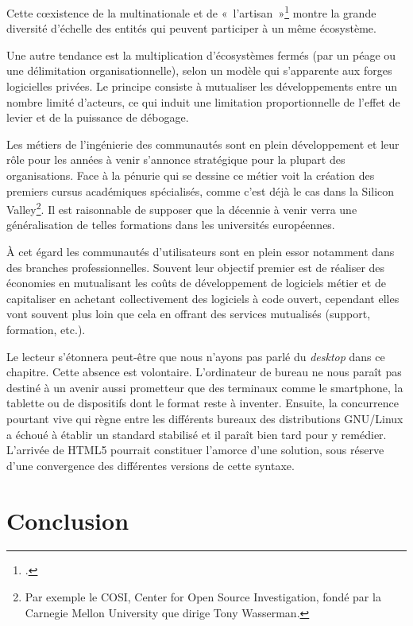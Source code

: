 \documentclass{FramateX}
\begin{document}
\begin{refsection}
Cette cœxistence de la multinationale et de
«~l'artisan~»\footnote{\cite{guesdonsur2012}.} montre la grande
diversité d'échelle des entités qui peuvent participer
à un même écosystème.

Une autre tendance est la multiplication d'écosystèmes fermés (par un
péage ou une délimitation organisationnelle), selon un modèle qui
s'apparente aux forges logicielles privées. Le principe consiste à
mutualiser les développements entre un nombre limité d'acteurs, ce qui
induit une limitation proportionnelle de l'effet de
levier et de la puissance de débogage.

Les métiers de l'ingénierie des communautés sont en
plein développement et leur rôle pour les années à venir
s'annonce stratégique pour la plupart des
organisations. Face à la pénurie qui se dessine ce métier voit la
création des premiers cursus académiques spécialisés, comme
c'est déjà le cas dans la Silicon Valley\footnote{Par
exemple le COSI, Center for Open Source Investigation, fondé par la
Carnegie Mellon University que dirige Tony Wasserman.}. Il est
raisonnable de supposer que la décennie à venir verra une
généralisation de telles formations dans les universités européennes.

À cet égard les communautés d'utilisateurs sont en plein essor notamment
dans des branches professionnelles. Souvent leur objectif premier est
de réaliser des économies en mutualisant les coûts de développement de
logiciels métier et de capitaliser en achetant collectivement des
logiciels à code ouvert, cependant elles vont souvent plus loin que
cela en offrant des services mutualisés (support, formation, etc.). 

Le lecteur s'étonnera peut-être que nous n'ayons pas parlé du
\textit{desktop} dans ce chapitre. Cette absence est volontaire.
L'ordinateur de bureau ne nous paraît pas destiné à un avenir aussi
prometteur que des terminaux comme le smartphone, la tablette ou de
dispositifs dont le format reste à inventer. Ensuite, la concurrence
pourtant vive qui règne entre les différents bureaux des distributions
GNU/Linux a échoué à établir un standard stabilisé et il paraît bien
tard pour y remédier. L'arrivée de HTML5 pourrait constituer l'amorce
d'une solution, sous réserve d'une convergence des
différentes versions de cette syntaxe.

\section*{Conclusion}
{}


\end{refsection}
\end{document}
